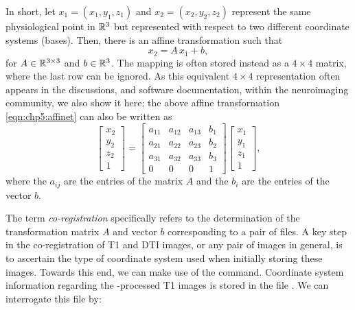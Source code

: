 In short, let $x_1 = (x_1, y_1, z_1)$ and $x_2 = (x_2, y_2, z_2)$ represent the
same physiological point in $\mathbb{R}^3$ but represented with respect to two
different coordinate systems (bases). Then, there is an affine
transformation such that
\begin{equation}\label{eqn:chp5:affinet}
x_2 = A\, x_1 + b,
\end{equation}
for $A \in \mathbb{R}^{3 \times 3}$ and $b \in \mathbb{R}^3$. The mapping is often
stored instead as a $4\times4$ matrix, where the last row can be
ignored.  As this equivalent $4\times 4$ representation often appears in the 
discussions, and software documentation, within the neuroimaging community, 
we also show it here; the above affine transformation \eqref{eqn:chp5:affinet} 
can also be written as 
\begin{equation*}
\left[\begin{array}{c}
x_{2}\\
y_{2}\\
z_{2}\\
1
\end{array}\right] = 
\left[
\begin{array}{cccc}
a_{11} & a_{12} & a_{13} & b_1 \\
a_{21} & a_{22} & a_{23} & b_2 \\
a_{31} & a_{32} & a_{33} & b_3 \\
0      &    0   &   0    & 1
\end{array}
\right]
\left[
\begin{array}{c}
x_1\\
y_1\\
z_1\\
1
\end{array}
\right],
\end{equation*}
where the $a_{ij}$ are the entries of the matrix $A$ and the $b_i$ are the 
entries of the vector $b$. 


The term \textit{co-registration} specifically refers to the
determination of the transformation matrix $A$ and vector $b$
corresponding to a pair of files.  %
%
A key step in the co-registration of T1 and DTI images, or any pair
of images in general, is to ascertain the type of coordinate system
used when initially storing these images. Towards this end, we can
make use of the  command.  Coordinate system
information regarding the {\freesurfer}-processed T1 images is stored
in the file . We can interrogate this file by:

